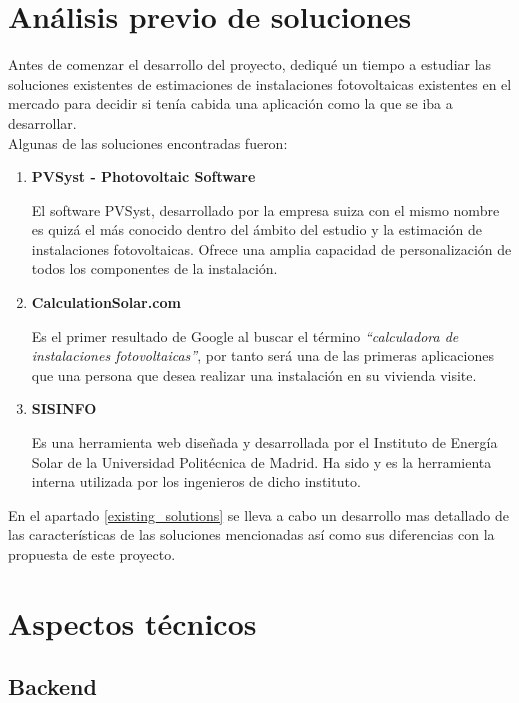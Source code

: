 \documentclass[11pt]{report}
\begin{document}
\section{Análisis previo de soluciones}

Antes de comenzar el desarrollo del proyecto, dediqué un tiempo a estudiar las soluciones existentes de estimaciones de instalaciones fotovoltaicas existentes en el mercado para decidir si tenía cabida una aplicación como la que se iba a desarrollar.\\

Algunas de las soluciones encontradas fueron:

\begin{enumerate}
\item \textbf{PVSyst - Photovoltaic Software}

El software PVSyst, desarrollado por la empresa suiza con el mismo nombre es quizá el más conocido dentro del ámbito del estudio y la estimación de instalaciones fotovoltaicas. Ofrece una amplia capacidad de personalización de todos los componentes de la instalación.

\item \textbf{CalculationSolar.com}

Es el primer resultado de Google al buscar el término \textit{``calculadora de instalaciones fotovoltaicas''}, por tanto será una de las primeras aplicaciones que una persona que desea realizar una instalación en su vivienda visite.

\item \textbf{SISINFO}

Es una herramienta web diseñada y desarrollada por el Instituto de Energía Solar de la Universidad Politécnica de Madrid. Ha sido y es la herramienta interna utilizada por los ingenieros de dicho instituto.

\end{enumerate}

En el apartado \ref{existing_solutions}  se lleva a cabo un desarrollo mas detallado de las características de las soluciones mencionadas así como sus diferencias con la propuesta de este proyecto.

\section{Aspectos técnicos}

\subsection{Backend}
\end{document}
